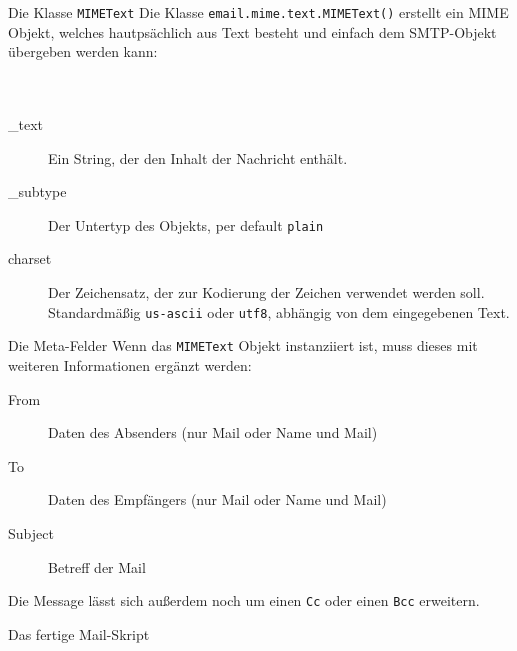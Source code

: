 \begin{frame}[fragile]{Die Klasse \texttt{MIMEText}}
	Die Klasse \texttt{email.mime.text.MIMEText()} erstellt ein MIME Objekt, welches hautps\"achlich aus Text besteht und einfach dem SMTP-Objekt \"ubergeben werden kann: \\ \ \\
	 \ \\
	
	\begin{description}
		\item[\_text] Ein String, der den Inhalt der Nachricht enth\"alt.
		\item[\_subtype] Der Untertyp des Objekts, per default \texttt{plain}
		\item[charset] Der Zeichensatz, der zur Kodierung der Zeichen verwendet werden soll. Standardm\"a\ss{}ig \texttt{us-ascii} oder \texttt{utf8}, abh\"angig von dem eingegebenen Text.
	\end{description}
\end{frame}

\begin{frame}[fragile]{Die Meta-Felder}
	Wenn das \texttt{MIMEText} Objekt instanziiert ist, muss dieses mit weiteren Informationen erg\"anzt werden:
	
	\begin{description}
		\item[From] Daten des Absenders (nur Mail oder Name und Mail)
		\item[To] Daten des Empfängers (nur Mail oder Name und Mail)
		\item[Subject] Betreff der Mail
	\end{description}
	Die Message l\"asst sich au\ss{}erdem noch um einen \texttt{Cc} oder einen \texttt{Bcc} erweitern.
\end{frame}

\begin{frame}{Das fertige Mail-Skript}
	
\end{frame}


